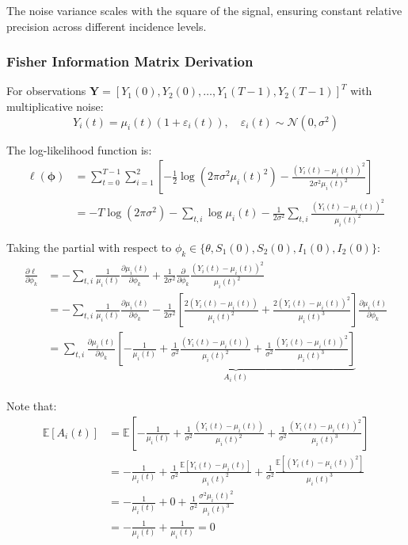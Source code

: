 The noise variance scales with the square of the signal, ensuring constant relative precision across different incidence levels.

\subsubsection{Fisher Information Matrix Derivation}

For observations $\mathbf{Y} = [Y_1(0), Y_2(0), \ldots, Y_1(T-1), Y_2(T-1)]^T$ with multiplicative noise:
\begin{equation}
Y_i(t) = \mu_i(t)(1 + \varepsilon_i(t)), \quad \varepsilon_i(t) \sim \mathcal{N}(0, \sigma^2)
\end{equation}

The log-likelihood function is:
\begin{align}
\ell(\boldsymbol{\phi}) &= \sum_{t=0}^{T-1} \sum_{i=1}^{2} \left[ -\frac{1}{2}\log(2\pi\sigma^2\mu_i(t)^2) - \frac{(Y_i(t) - \mu_i(t))^2}{2\sigma^2 \mu_i(t)^2} \right] \\
&= -T\log(2\pi\sigma^2) - \sum_{t,i} \log\mu_i(t) - \frac{1}{2\sigma^2}\sum_{t,i} \frac{(Y_i(t) - \mu_i(t))^2}{\mu_i(t)^2}
\end{align}


Taking the partial  with respect to $\phi_k \in \{\theta, S_1(0), S_2(0), I_1(0), I_2(0)\}$:
\begin{align}\label{eq:partial}
  \begin{split}
  \frac{\partial \ell}{\partial \phi_k} &= -\sum_{t,i} \frac{1}{\mu_i(t)} \frac{\partial \mu_i(t)}{\partial \phi_k} + \frac{1}{2\sigma^2} \frac{\partial}{\partial \phi_k}\frac{(Y_i(t) - \mu_i(t))^2}{\mu_i(t)^2}\\
  &= -\sum_{t,i} \frac{1}{\mu_i(t)} \frac{\partial \mu_i(t)}{\partial \phi_k} - \frac{1}{2\sigma^2}\left[\frac{2(Y_i(t) - \mu_i(t))}{\mu_i(t)^2} +\frac{2(Y_i(t) - \mu_i(t))^2}{\mu_i(t)^3}\right ] \frac{\partial \mu_i(t)}{\partial \phi_k} \\
  &=\sum_{t,i} \frac{\partial \mu_i(t)}{\partial \phi_k} \underbrace{\left[-\frac{1}{\mu_i(t)} + \frac{1}{\sigma^2}\frac{(Y_i(t) - \mu_i(t))}{\mu_i(t)^2} + \frac{1}{\sigma^2}\frac{(Y_i(t) - \mu_i(t))^2}{\mu_i(t)^3}\right]}_{A_i(t)}
  \end{split}
\end{align}

Note that:
\begin{align*}
\mathbb{E}[A_i(t)] &= \mathbb{E}\left[-\frac{1}{\mu_i(t)} + \frac{1}{\sigma^2}\frac{(Y_i(t) - \mu_i(t))}{\mu_i(t)^2} + \frac{1}{\sigma^2}\frac{(Y_i(t) - \mu_i(t))^2}{\mu_i(t)^3}\right] \\
&= -\frac{1}{\mu_i(t)} + \frac{1}{\sigma^2}\frac{\mathbb{E}[Y_i(t) - \mu_i(t)]}{\mu_i(t)^2} + \frac{1}{\sigma^2}\frac{\mathbb{E}[(Y_i(t) - \mu_i(t))^2]}{\mu_i(t)^3} \\
&= -\frac{1}{\mu_i(t)} + 0 + \frac{1}{\sigma^2}\frac{\sigma^2\mu_i(t)^2}{\mu_i(t)^3} \\
&= -\frac{1}{\mu_i(t)} + \frac{1}{\mu_i(t)} = 0
\end{align*}

